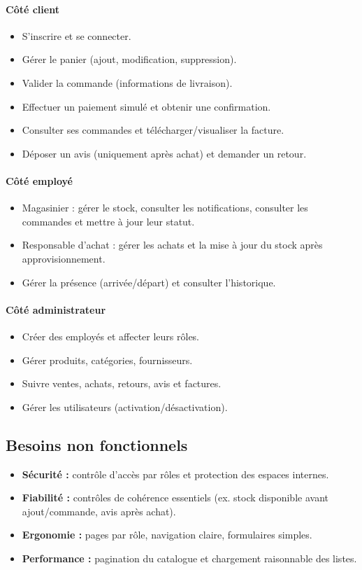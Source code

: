 \documentclass[12pt,a4paper]{report}
\begin{document}
\paragraph{Côté client}
\begin{itemize}
    \item S’inscrire et se connecter.
    \item Gérer le panier (ajout, modification, suppression).
    \item Valider la commande (informations de livraison).
    \item Effectuer un paiement simulé et obtenir une confirmation.
    \item Consulter ses commandes et télécharger/visualiser la facture.
    \item Déposer un avis (uniquement après achat) et demander un retour.
\end{itemize}

\paragraph{Côté employé}
\begin{itemize}
    \item Magasinier : gérer le stock, consulter les notifications, consulter les commandes et mettre à jour leur statut.
    \item Responsable d'achat : gérer les achats et la mise à jour du stock après approvisionnement.
    \item Gérer la présence (arrivée/départ) et consulter l’historique.
\end{itemize}

\paragraph{Côté administrateur}
\begin{itemize}
    \item Créer des employés et affecter leurs rôles.
    \item Gérer produits, catégories, fournisseurs.
    \item Suivre ventes, achats, retours, avis et factures.
    \item Gérer les utilisateurs (activation/désactivation).
\end{itemize}

\subsection{Besoins non fonctionnels}
\begin{itemize}
    \item \textbf{Sécurité :} contrôle d’accès par rôles et protection des espaces internes.
    \item \textbf{Fiabilité :} contrôles de cohérence essentiels (ex. stock disponible avant ajout/commande, avis après achat).
    \item \textbf{Ergonomie :} pages par rôle, navigation claire, formulaires simples.
    \item \textbf{Performance :} pagination du catalogue et chargement raisonnable des listes.
\end{itemize}
\end{document}
